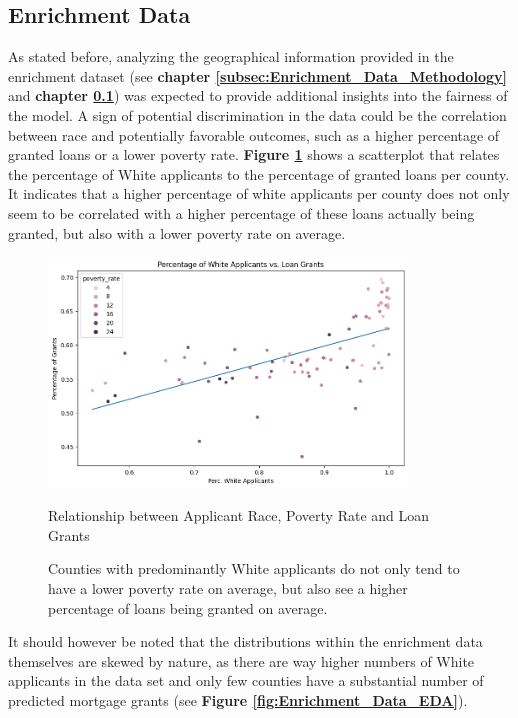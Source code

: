 \subsection{Enrichment Data}\label{subsec:Enrichment_Data}

As stated before, analyzing the geographical information provided in the enrichment dataset (see \textbf{chapter \ref{subsec:Enrichment_Data_Methodology}} and \textbf{chapter \ref{subsec:Enrichment_Data}}) was expected to provide additional insights into the fairness of the model.
A sign of potential discrimination in the data could be the correlation between race and potentially favorable outcomes, such as a higher percentage of granted loans or a lower poverty rate.
\textbf{Figure \ref{fig:Scatter_White_Applicants_Loan_Grant}} shows a scatterplot that relates the percentage of White applicants to the percentage of granted loans per county. It indicates that a higher percentage of white applicants per county does not only seem to be correlated with a higher percentage of these loans actually being granted, but also with a lower poverty rate on average.

\begin{figure}[h]
    \centering
    \includegraphics[width=0.85\textwidth]{images/CHXX_Perc_Grants_vs_Perc_White.png}
    \caption{Relationship between Applicant Race, Poverty Rate and Loan Grants}
    \caption*{Counties with predominantly White applicants do not only tend to have a lower poverty rate on average, but also see a higher percentage of loans being granted on average.}
    \label{fig:Scatter_White_Applicants_Loan_Grant}
\end{figure}

It should however be noted that the distributions within the enrichment data themselves are skewed by nature, as there are way higher numbers of White applicants in the data set and only few counties have a substantial number of predicted mortgage grants (see \textbf{Figure \ref{fig:Enrichment_Data_EDA}}).

